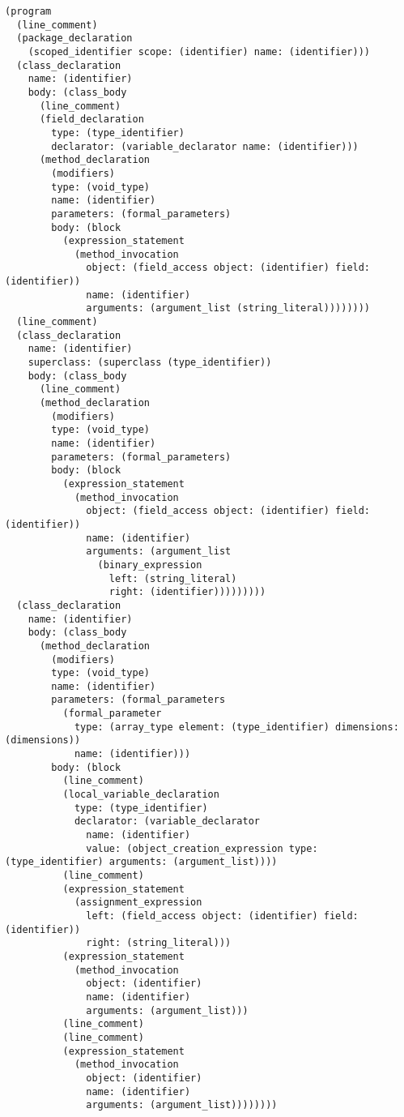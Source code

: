 \begin{verbatim}
(program
  (line_comment)
  (package_declaration
    (scoped_identifier scope: (identifier) name: (identifier)))
  (class_declaration
    name: (identifier)
    body: (class_body
      (line_comment)
      (field_declaration
        type: (type_identifier)
        declarator: (variable_declarator name: (identifier)))
      (method_declaration
        (modifiers)
        type: (void_type)
        name: (identifier)
        parameters: (formal_parameters)
        body: (block
          (expression_statement
            (method_invocation
              object: (field_access object: (identifier) field: (identifier))
              name: (identifier)
              arguments: (argument_list (string_literal))))))))
  (line_comment)
  (class_declaration
    name: (identifier)
    superclass: (superclass (type_identifier))
    body: (class_body
      (line_comment)
      (method_declaration
        (modifiers)
        type: (void_type)
        name: (identifier)
        parameters: (formal_parameters)
        body: (block
          (expression_statement
            (method_invocation
              object: (field_access object: (identifier) field: (identifier))
              name: (identifier)
              arguments: (argument_list
                (binary_expression
                  left: (string_literal)
                  right: (identifier)))))))))
  (class_declaration
    name: (identifier)
    body: (class_body
      (method_declaration
        (modifiers)
        type: (void_type)
        name: (identifier)
        parameters: (formal_parameters
          (formal_parameter
            type: (array_type element: (type_identifier) dimensions: (dimensions))
            name: (identifier)))
        body: (block
          (line_comment)
          (local_variable_declaration
            type: (type_identifier)
            declarator: (variable_declarator
              name: (identifier)
              value: (object_creation_expression type: (type_identifier) arguments: (argument_list))))
          (line_comment)
          (expression_statement
            (assignment_expression
              left: (field_access object: (identifier) field: (identifier))
              right: (string_literal)))
          (expression_statement
            (method_invocation
              object: (identifier)
              name: (identifier)
              arguments: (argument_list)))
          (line_comment)
          (line_comment)
          (expression_statement
            (method_invocation
              object: (identifier)
              name: (identifier)
              arguments: (argument_list))))))))
\end{verbatim}

